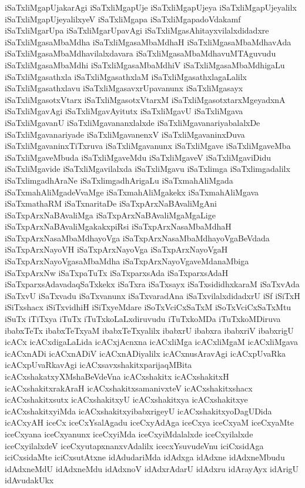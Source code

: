 {iSaTxliMgapUjakarAgi
iSaTxliMgapUje
iSaTxliMgapUjeya
iSaTxliMgapUjeyalilx
iSaTxliMgapUjeyalilxyeV
iSaTxliMgapa
iSaTxliMgapadoVdakamf
iSaTxliMgarUpa
iSaTxliMgarUpavAgi
iSaTxliMgasAhitayxvilalxdidadxre
iSaTxliMgasaMbaMdha
iSaTxliMgasaMbaMdhaH
iSaTxliMgasaMbaMdhavAda
iSaTxliMgasaMbaMdhavilalxdavara
iSaTxliMgasaMbaMdhavuMTAguvudu
iSaTxliMgasaMbaMdhi
iSaTxliMgasaMbaMdhiV
iSaTxliMgasaMbaMdhigaLu
iSaTxliMgasathxla
iSaTxliMgasathxlaM
iSaTxliMgasathxlagaLalilx
iSaTxliMgasathxlavu
iSaTxliMgasavxrUpavanunx
iSaTxliMgasayx
iSaTxliMgasotxVtarx
iSaTxliMgasotxVtarxM
iSaTxliMgasotxtarxMgeyadxnA
iSaTxliMgavAgi
iSaTxliMgavAyitutx
iSaTxliMgavU
iSaTxliMgava
iSaTxliMgavanU
iSaTxliMgavananxlalxde
iSaTxliMgavanariyabalalxDe
iSaTxliMgavanariyade
iSaTxliMgavanenxV
iSaTxliMgavaninxDuva
iSaTxliMgavaninxTiTxruva
iSaTxliMgavanunx
iSaTxliMgave
iSaTxliMgaveMba
iSaTxliMgaveMbuda
iSaTxliMgaveMdu
iSaTxliMgaveV
iSaTxliMgaviDidu
iSaTxliMgavide
iSaTxliMgavilalxda
iSaTxliMgavu
iSaTxlimga
iSaTxlimgadalilx
iSaTxlimgadhAraNe
iSaTxlimgadhArigaLu
iSaTxmahAliMgada
iSaTxmahAliMgadeVvaMge
iSaTxmahAliMgakekx
iSaTxmahAliMgava
iSaTxmathaRM
iSaTxnaritaDe
iSaTxpArxNaBAvaliMgAni
iSaTxpArxNaBAvaliMga
iSaTxpArxNaBAvaliMgaMgaLige
iSaTxpArxNaBAvaliMgakakxpiRsi
iSaTxpArxNasaMbaMdhaH
iSaTxpArxNasaMbaMdhayoVga
iSaTxpArxNasaMbaMdhayoVgaBeVdada
iSaTxpArxNayoVH
iSaTxpArxNayoVga
iSaTxpArxNayoVgaH
iSaTxpArxNayoVgasaMbaMdha
iSaTxpArxNayoVgaveMdanaMbiga
iSaTxpArxNw
iSaTxpaTuTx
iSaTxparxsAda
iSaTxparxsAdaH
iSaTxparxsAdavadaqSaTxkekx
iSaTxra
iSaTxsayx
iSaTxsididhxkaraM
iSaTxvAda
iSaTxvU
iSaTxvadu
iSaTxvanunx
iSaTxvaradAna
iSaTxvilalxdidadxrU
iSf
iSiTxH
iSiTxshacx
iSiTxvidhiH
iSiTxyeMdare
iSoTxVciCxSaTxM
iSoTxVciCxSaTxMtu
iSuTx
iTiTxya
iTuTx
iTuTxkoLaLxdiruvudu
iTuTxkoMDa
iTuTxkoMDiruva
ibabxTeTx
ibabxTeTxyaM
ibabxTeTxyalilx
ibabxrU
ibabxra
ibabxriV
ibabxrigU
icACx
icACxdigaLaLida
icACxjAcnxna
icACxliMga
icACxliMgaM
icACxliMgava
icACxnADi
icACxnADiV
icACxnADiyalilx
icACxnusAravAgi
icACxpUvaRka
icACxpUvaRkavAgi
icACxsavxshakitxparijaqMBita
icACxshakatxyXMshaBeVdeVna
icACxshakitx
icACxshakitxH
icACxshakitxrakAraH
icACxshakitxsamanivxteV
icACxshakitxshacx
icACxshakitxsutx
icACxshakitxyU
icACxshakitxya
icACxshakitxye
icACxshakitxyiMda
icACxshakitxyibabxrigeyU
icACxshakitxyoDagUDida
icACxyAH
iceCx
iceCxYsalAgadu
iceCxyAdAga
iceCxya
iceCxyaM
iceCxyaMte
iceCxyana
iceCxyanunx
iceCxyiMda
iceCxyiMdalalxde
iceCxyilalxde
iceCxyilalxdeV
iceCxyutapxnanxvAdalilx
icecxYsuvudeVnu
iciCxsidAga
iciCxsidaMte
iciCxsutAtxne
idAdudariMda
idAdxga
idAdxne
idAdxneMbudu
idAdxneMdU
idAdxneMdu
idAdxnoV
idAdxrAdarU
idAdxru
idArayAyx
idArigU
idAvudakUkx
}
